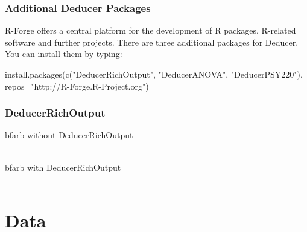 \documentclass[xcolor={table},c]{beamer}
\begin{document}
\begin{frame}[fragile]\frametitle{Additional Deducer Packages}
  R-Forge offers a central platform for the development of R packages, R-related software and further projects. 
  There are three additional packages for Deducer. You can install them by typing:
\begin{semiverbatim}
install.packages(c("DeducerRichOutput",
                   "DeducerANOVA",
                   "DeducerPSY220"),
                 repos="http://R-Forge.R-Project.org")
\end{semiverbatim}    
\end{frame}

\begin{frame}[shrink=15]\frametitle{DeducerRichOutput}
\begin{beamercolorbox}[sep=0.5em,wd=14cm]{bfarb}
without DeducerRichOutput\\
\\
\end{beamercolorbox}
\vspace*{0.4cm}
\begin{beamercolorbox}[sep=0.5em,wd=14cm]{bfarb}
with DeducerRichOutput\\
\\
\end{beamercolorbox}
\end{frame}

\section{Data}
\end{document}
